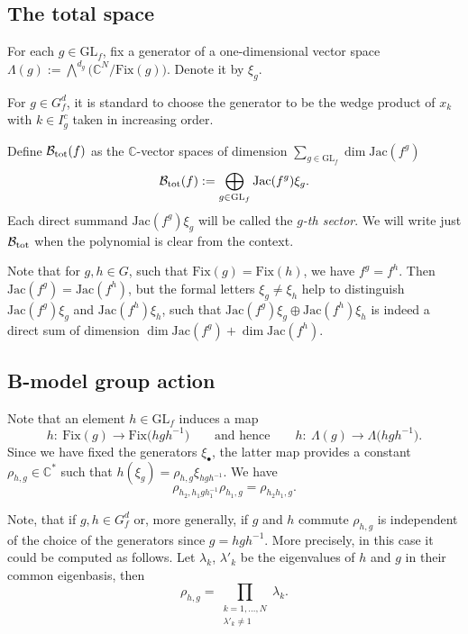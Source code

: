 \documentclass[pdftex]{sigma}
\numberwithin{equation}{section}
\newcommand{\CC}{{\mathbb{C}}}
\newcommand{\GL}{{\mathrm{GL}}}
\newcommand{\Jac}{\mathrm{Jac}}
\newcommand{\Fix}{\mathrm{Fix}}
\def\B{{\mathcal B}}
\begin{document}
\subsection{The total space}
For each $g\in \GL_f$, fix a generator of a one-dimensional vector space $\Lambda(g):=\bigwedge^{d_g}\bigl(\CC^N/\Fix(g)\bigr)$. Denote it by $\xi_g$.

For $g\in G_f^d$, it is standard to choose the generator to be the wedge product of $x_k$ with $k\in I^c_g$ taken in increasing order.

Define $\B_{\rm tot}(f)$ as the $\CC$-vector spaces of dimension $\sum_{g \in \GL_f} \dim \Jac(f^g)$
\begin{equation}\label{eq: Btot in jac sectors}
	\B_{\rm tot}(f) := \bigoplus_{g \in \GL_f} \Jac(f^g) \xi_g.
\end{equation}
Each direct summand $\Jac(f^g) \xi_g$ will be called the \textit{$g$-th sector}.
We will write just $\B_{\rm tot}$ when the polynomial is clear from the context.

\begin{Remark}
Note that for $g,h \in G$, such that $\Fix(g) = \Fix(h)$, we have $f^g = f^h$. Then $\Jac(f^g) = \Jac(f^h)$, but the formal letters $\xi_g \neq \xi_h$ help to distinguish $\Jac(f^g) \xi_g$ and $\Jac(f^h)\xi_h$, such that $\Jac(f^g) \xi_g \oplus \Jac(f^h)\xi_h$ is indeed a direct sum of dimension $\dim\Jac(f^g)+\dim\Jac(f^h)$.
\end{Remark}

\subsection{B-model group action}

Note that an element $h\in\GL_f$ induces a map
\[h\colon \ \Fix(g)\to \Fix\bigl(hgh^{-1}\bigr)\qquad \text{and hence}\qquad h\colon\ \Lambda(g)\to \Lambda\bigl(hgh^{-1}\bigr).\] Since we have fixed the generators $\xi_\bullet$, the latter map provides a constant $\rho_{h,g}\in\CC^*$ such that $h ( \xi_{g} ) = \rho_{h,g} \xi_{hgh^{-1}}$. We have
\begin{equation}\label{eq: rho relation}
 \rho_{h_2,h_1gh_1^{-1}}\rho_{h_1,g}=\rho_{h_2h_1,g}.
\end{equation}

Note, that if $g,h\in G_f^d$ or, more generally, if $g$ and $h$ commute $\rho_{h,g}$ is independent of the choice of the generators since $g=hgh^{-1}$. More precisely, in this case it could be computed as follows. Let $\lambda_k$, $\lambda'_k$ be the eigenvalues of $h$ and $g$ in their common eigenbasis, then
\begin{equation*}%
 \rho_{h,g}=\prod_{\substack{ k=1,\dots,N \\ \lambda'_k \neq 1}} \lambda_k.
\end{equation*}
\end{document}
